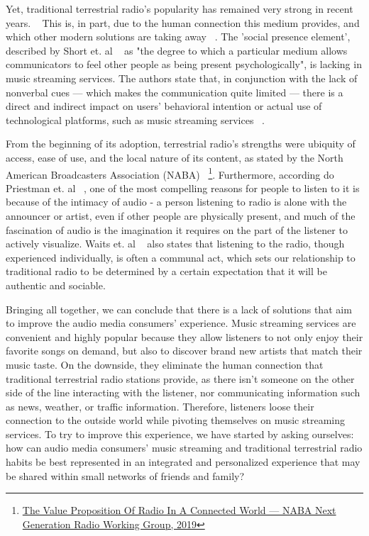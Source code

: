 Yet, traditional terrestrial radio's popularity has remained very strong in recent years. ~\cite{Albarran2007} This is, in part, due to the human connection this medium provides, and which other modern solutions are taking away ~\cite{Waits2007}. The 'social presence element', described by Short et. al ~\cite{JohnShortEderynWilliams1976} as "the degree to which a particular medium allows communicators to feel other people as being present psychologically", is lacking in music streaming services. The authors state that, in conjunction with the lack of nonverbal cues —  which makes the communication quite limited — there is a direct and indirect impact on users’ behavioral intention or actual use of technological platforms, such as music streaming services ~\cite{Wang2014}.

From the beginning of its adoption, terrestrial radio's strengths were ubiquity of access, ease of use, and the local nature of its content, as stated by the North American Broadcasters Association (NABA) ~\footnote{\href{https://nabanet.com/wp-content/uploads/2019/03/NGR-WG-Value-Proposition-of-Radio-in-a-Connected-World-2019-03-15.pdf}{The Value Proposition Of Radio In A Connected World — NABA Next Generation Radio Working Group, 2019}}. Furthermore, according do Priestman et. al ~\cite{Priestman2005}, one of the most compelling reasons for people to listen to it is because of the intimacy of audio - a person listening to radio is alone with the announcer or artist, even if other people are physically present, and much of the fascination of audio is the imagination it requires on the part of the listener to actively visualize. Waits et. al ~\cite{Waits2007} also states that listening to the radio, though experienced individually, is often a communal act, which sets our relationship to traditional radio to be determined by a certain expectation that it will be authentic and sociable.

Bringing all together, we can conclude that there is a lack of solutions that aim to improve the audio media consumers' experience. Music streaming services are convenient and highly popular because they allow listeners to not only enjoy their favorite songs on demand, but also to discover brand new artists that match their music taste. On the downside, they eliminate the human connection that traditional terrestrial radio stations provide, as there isn't someone on the other side of the line interacting with the listener, nor communicating information such as news, weather, or traffic information. Therefore, listeners loose their connection to the outside world while pivoting themselves on music streaming services. To try to improve this experience, we have started by asking ourselves: how can audio media consumers' music streaming and traditional terrestrial radio habits be best represented in an integrated and personalized experience that may be shared within small networks of friends and family?


